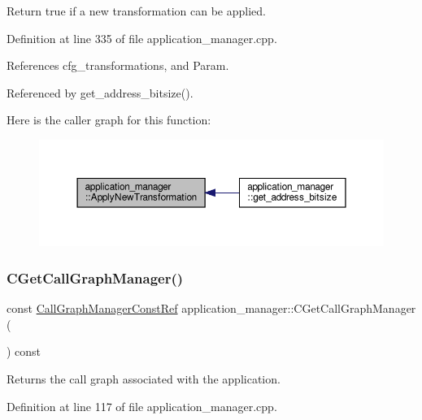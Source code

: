 Return true if a new transformation can be applied. 



Definition at line 335 of file application\+\_\+manager.\+cpp.



References cfg\+\_\+transformations, and Param.



Referenced by get\+\_\+address\+\_\+bitsize().

Here is the caller graph for this function\+:
\nopagebreak
\begin{figure}[H]
\begin{center}
\leavevmode
\includegraphics[width=350pt]{dc/db5/classapplication__manager_a915cefdfbd50a26581c5ac028884cf6b_icgraph}
\end{center}
\end{figure}
\mbox{\label{classapplication__manager_a087dd36277853a12e84e84da91e82784}} 
\subsubsection{\texorpdfstring{C\+Get\+Call\+Graph\+Manager()}{CGetCallGraphManager()}}
{\footnotesize\ttfamily const \hyperlink{call__graph__manager_8hpp_a19eec454bbf914c67fe80bcf28e4a90f}{Call\+Graph\+Manager\+Const\+Ref} application\+\_\+manager\+::\+C\+Get\+Call\+Graph\+Manager (\begin{DoxyParamCaption}{ }\end{DoxyParamCaption}) const}



Returns the call graph associated with the application. 



Definition at line 117 of file application\+\_\+manager.\+cpp.



